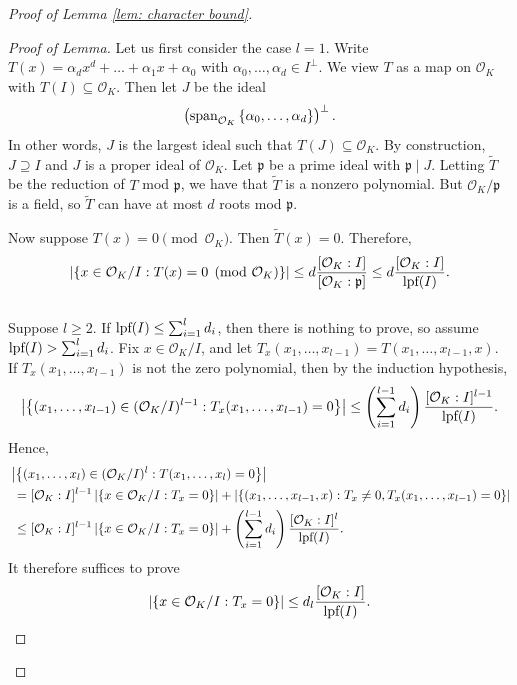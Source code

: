 \documentclass{amsart}
\theoremstyle{definition}
\numberwithin{equation}{section}
\newcommand{\p}{\mathfrak{p}}
\newcommand{\mO}{\mathcal{O}}
\newcommand{\lpf}{\normalfont\text{lpf}}
\renewcommand{\tilde}{\widetilde}
\begin{document}
\begin{proof}[Proof of Lemma \ref{lem: character bound}]
	\begin{proof}[Proof of Lemma]
		Let us first consider the case $l = 1$.
        Write $T(x) = \alpha_d x^d + \ldots + \alpha_1 x + \alpha_0$ with $\alpha_0, \ldots, \alpha_d \in I^{\perp}$.
        We view $T$ as a map on $\mO_K$ with $T(I) \subseteq \mO_K$.
        Then let $J$ be the ideal
        \begin{equation*}
            \left( \textup{span}_{\mO_K}\left\{ \alpha_0, \ldots, \alpha_d \right\} \right)^{\perp}.
        \end{equation*}
        In other words, $J$ is the largest ideal such that $T(J) \subseteq \mO_K$.
        By construction, $J \supseteq I$ and $J$ is a proper ideal of $\mO_K$.
        Let $\p$ be a prime ideal with $\p \mid J$.
        Letting $\tilde{T}$ be the reduction of $T$ mod $\p$, we have that $\tilde{T}$ is a nonzero polynomial.
        But $\mO_K/\p$ is a field, so $\tilde{T}$ can have at most $d$ roots mod $\p$.
		
		Now suppose $T(x) = 0 \pmod{\mO_K}$.
		Then $\tilde{T}(x) = 0$.
		Therefore,
		\begin{equation*}
			\left| \{x \in \mO_K/I : T(x) = 0 \pmod{\mO_K} \} \right| \le d \frac{[\mO_K:I]}{[\mO_K:\p]} \le d \frac{[\mO_K:I]}{\lpf(I)}.
		\end{equation*} \\
		
		Suppose $l \ge 2$.
		If $\lpf(I) \le \sum_{i=1}^l{d_i}$, then there is nothing to prove, so assume $\lpf(I) > \sum_{i=1}^l{d_i}$.
		Fix $x \in \mO_K/I$, and let $T_x(x_1, \dots, x_{l-1}) = T(x_1, \dots, x_{l-1}, x)$.
		If $T_x(x_1, \dots, x_{l-1})$ is not the zero polynomial, then by the induction hypothesis,
		\begin{equation*}
			\left| \left\{ (x_1, \dots, x_{l-1}) \in (\mO_K/I)^{l-1} : T_x(x_1, \dots, x_{l-1}) = 0 \right\} \right| \le \left( \sum_{i=1}^{l-1}{d_i} \right) \frac{[\mO_K:I]^{l-1}}{\lpf(I)}.
		\end{equation*}
		Hence,
		\begin{align*}
			& \left| \left\{ (x_1, \dots, x_l) \in (\mO_K/I)^l : T(x_1, \dots, x_l) = 0 \right\} \right| \\
			 &~= [\mO_K:I]^{l-1} \left| \{x \in \mO_K/I : T_x = 0\} \right|
			 + \left| \{(x_1, \dots, x_{l-1}, x) : T_x \ne 0, T_x(x_1, \dots, x_{l-1}) = 0\} \right| \\
			 &~\le [\mO_K:I]^{l-1} \left| \{x \in \mO_K/I : T_x = 0\} \right| + \left( \sum_{i=1}^{l-1}{d_i} \right) \frac{[\mO_K:I]^l}{\lpf(I)}.
		\end{align*}
		It therefore suffices to prove
		\begin{equation*}
			\left| \{x \in \mO_K/I : T_x = 0\} \right| \le d_l \frac{[\mO_K:I]}{\lpf(I)}.
		\end{equation*}
		

\end{proof}
\end{proof}
\end{document}
